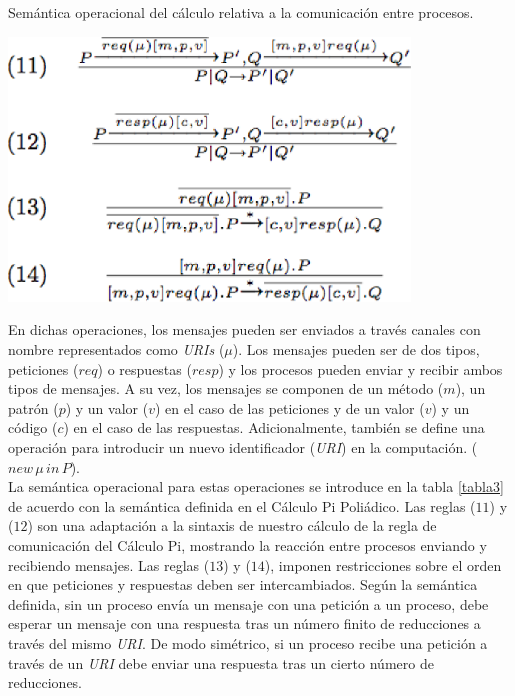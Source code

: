 \begin{table}
\vspace{2.4in}
\caption{Sem\'antica operacional del c\'alculo relativa a la comunicaci\'on entre procesos.}
\includegraphics[width=0.8\textwidth]{tabla3}
\label{tabla3}
\end{table}

En dichas operaciones, los mensajes pueden ser enviados a trav\'es canales con nombre representados como \textit{URIs} ($\mu$). Los mensajes pueden ser de dos tipos, peticiones ($req$) o respuestas ($resp$) y los procesos pueden enviar y recibir ambos tipos de mensajes. A su vez, los mensajes se componen de un m\'etodo ($m$), un patr\'on ($p$) y un valor ($v$) en el caso de las peticiones y de un valor ($v$) y un c\'odigo ($c$) en el caso de las respuestas. Adicionalmente, tambi\'en se define una operaci\'on para introducir un nuevo identificador (\textit{URI}) en la computaci\'on. ($new\, \mu\, in\,P$).\\
La sem\'antica operacional para estas operaciones se introduce en la tabla \ref{tabla3} de acuerdo con la sem\'antica definida en el C\'alculo Pi Poli\'adico. Las reglas ($11$) y ($12$) son una adaptaci\'on a la sintaxis de nuestro c\'alculo de la regla de comunicaci\'on del C\'alculo Pi, mostrando la reacci\'on entre procesos enviando y recibiendo mensajes. Las reglas ($13$) y ($14$), imponen restricciones sobre el orden en que peticiones y respuestas deben ser intercambiados. Seg\'un la sem\'antica definida, sin un proceso env\'ia un mensaje con una petici\'on a un proceso, debe esperar un mensaje con una respuesta  tras un n\'umero finito de reducciones a trav\'es del mismo \textit{URI}. De modo sim\'etrico, si un proceso recibe una petici\'on a trav\'es de un \textit{URI} debe enviar una respuesta tras un cierto n\'umero de reducciones.\\

